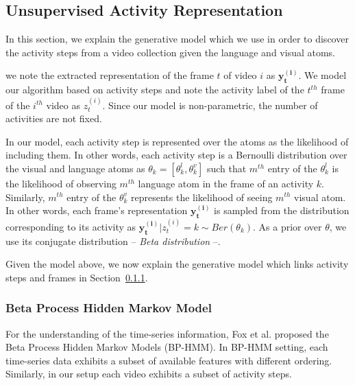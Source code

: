 \subsection{Unsupervised Activity Representation}
\label{basics}
In this section, we explain the generative model which we use in order to discover the activity steps from a video collection given the language and visual atoms.

we note the extracted representation of the frame $t$ of video $i$ as $\mathbf{y^{(i)}_t}$. We model our algorithm based on activity steps and note the activity label of the $t^{th}$ frame of the $i^{th}$ video as $z^{(i)}_t$. Since our model is non-parametric, the number of activities are not fixed.


In our model, each activity step is represented over the atoms as the likelihood of including them. In other words, each activity step is a Bernoulli distribution over the visual and language atoms as $\theta_k=[\theta_k^l,\theta_k^v]$ such that $m^{th}$ entry of the $\theta_k^l$ is the likelihood of observing $m^{th}$ language atom in the frame of an activity $k$. Similarly, $m^{th}$ entry of the $\theta_k^v$ represents the likelihood of seeing $m^{th}$ visual atom. In other words, each frame's representation $\mathbf{y^{(i)}_t}$ is sampled from the distribution corresponding to its activity as \mbox{$\mathbf{y^{(i)}_t}|z^{(i)}_t=k \sim Ber(\theta_k)$}. As a prior over $\theta$, we use its conjugate distribution -- \emph{Beta distribution} --.

Given the model above, we now explain the generative model which links activity steps and frames in Section~\ref{bphmm}. 
\subsubsection{Beta Process Hidden Markov Model}
\label{bphmm}
For the understanding of the time-series information, Fox et al.\cite{foxBPHMM} proposed the Beta Process Hidden Markov Models (BP-HMM). In BP-HMM setting, each time-series data exhibits a subset of available features with different ordering. Similarly, in our setup each video exhibits a subset of activity steps.

